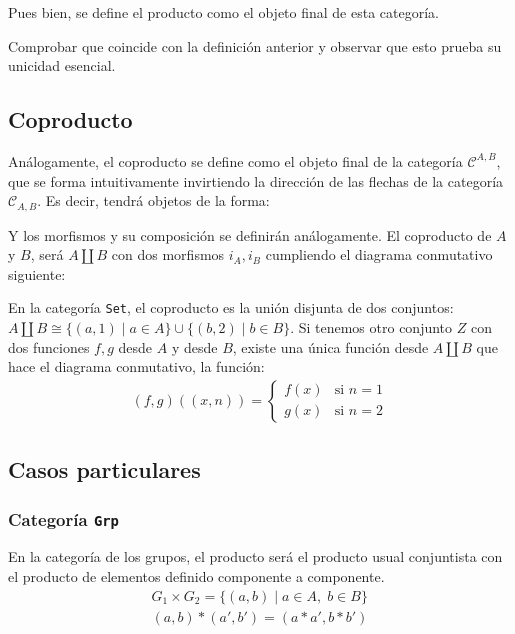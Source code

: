 \documentclass[11pt, fleqn, spanish]{book}
\newcommand{\C}{\mathcal{C} }
\newcommand{\twopartdef}[4]
{
	\left\{
		\begin{array}{ll}
			#1 & \mbox{si } #2 \\
			#3 & \mbox{si } #4
		\end{array}
	\right.
}
\begin{document}
    Pues bien, se define el producto como el objeto final de esta categoría.
    \begin{exercise} 
      Comprobar que coincide con la definición anterior y observar que esto
      prueba su unicidad esencial.
    \end{exercise}
    
  \subsection{Coproducto}
    Análogamente, el coproducto se define como el objeto final de la categoría $\C^{A,B}$,
    que se forma intuitivamente invirtiendo la dirección de las flechas de la categoría $\C_{A,B}$.
    Es decir, tendrá objetos de la forma:
    \begin{center}
    \end{center}
    Y los morfismos y su composición se definirán análogamente.
    El coproducto de $A$ y $B$, será $A \amalg B$ con dos morfismos $i_A,i_B$ cumpliendo
    el diagrama conmutativo siguiente:
    \begin{center}
    \end{center}
    
    \begin{example} 
      En la categoría \texttt{Set}, el coproducto es la unión disjunta de dos conjuntos: 
      $A \amalg B \cong \{(a,1) \; | \; a \in A\} \cup \{(b,2) \; | \; b \in B \}$. Si tenemos otro conjunto $Z$
      con dos funciones $f,g$ desde $A$ y desde $B$, existe una única función desde $A \amalg B$
      que hace el diagrama conmutativo, la función:
      \begin{gather*}
      (f,g)((x,n)) = \twopartdef{f(x)}{n = 1}{g(x)}{n = 2}
      \end{gather*}
    \end{example}


    
  \subsection{Casos particulares}
  \subsubsection{Categoría \texttt{Grp}}
    En la categoría de los grupos, el producto será el producto usual conjuntista con el
    producto de elementos definido componente a componente.
    \begin{align*}
     G_1 \times G_2 = \{(a,b)\; |\; a \in A,\; b \in B\} \\
     (a,b) \ast (a',b') = (a \ast a', b \ast b')
    \end{align*}
\end{document}
